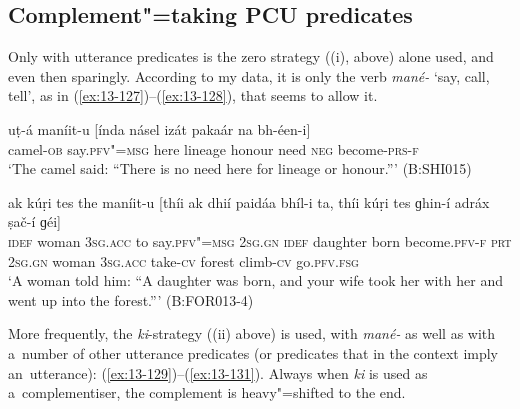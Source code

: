 \subsection{Complement"=taking PCU predicates}
\label{subsec:13-5-1}

 Only with utterance predicates is the zero strategy ((i), above) alone used, and even then sparingly. According to my data, it is only the verb \textit{mané-} `say, call, tell', as in (\ref{ex:13-127})--(\ref{ex:13-128}), that seems to allow it.

\begin{exe}
\ex
\label{ex:13-127}
\gll uṭ-á maníit-u [índa násel izát pakaár  na bh-éen-i]  \\
camel-\textsc{ob}  say.\textsc{pfv"=msg} here lineage honour need  \textsc{neg} become-\textsc{prs-f} \\
\glt `The camel said: ``There is no need here for lineage or honour.''' (B:SHI015)

\ex
\label{ex:13-128}
\gll ak kúṛi tes the maníit-u [thíi ak  dhií paidáa bhíl-i ta, thíi
  kúṛi tes  ɡhin-í adráx ṣač-í ɡéi] \\
\textsc{idef} woman \textsc{3sg.acc} to say.\textsc{pfv"=msg} \textsc{2sg.gn} \textsc{idef}  daughter born become.\textsc{pfv-f} \textsc{prt} \textsc{2sg.gn} woman \textsc{3sg.acc}  take-\textsc{cv} forest climb-\textsc{cv} go.\textsc{pfv.fsg}  \\
\glt `A woman told him: ``A daughter was born, and your wife took her with her and went up into the forest.''' (B:FOR013-4) 
\end{exe}

More frequently, the \textit{ki}-strategy ((ii) above) is used, with \textit{mané-} as well as with a~number of other utterance predicates (or predicates that in the context imply an~utterance): (\ref{ex:13-129})--(\ref{ex:13-131}). Always when \textit{ki} is used as a~complementiser, the complement is heavy"=shifted to the end.

